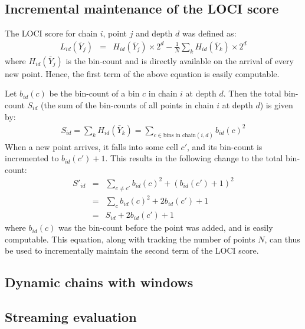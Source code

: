 \documentclass[11pt,onecolumn]{article}
\begin{document}
\pagebreak

\subsection{Incremental maintenance of the LOCI score}

The LOCI score for chain $i$, point $j$ and depth $d$ was defined as:
\begin{eqnarray}
	L_{id}(\bar{Y}_j) &=& H_{id}(\bar{Y}_j)\times 2^d - \frac{1}{N}\sum_{k}H_{id}(\bar{Y}_k)\times 2^d
\end{eqnarray}
where $H_{id}(\bar{Y}_j)$ is the bin-count and is directly available on the arrival of every new point. Hence, the first term of the above equation is easily computable.

Let $b_{id}(c)$ be the bin-count of a bin $c$ in chain $i$ at depth $d$. Then the total bin-count $S_{id}$ (the sum of the bin-counts of all points in chain $i$ at depth $d$) is given by:
\begin{eqnarray}
	S_{id} = \sum_{k}H_{id}(\bar{Y}_k) = \sum_{c \in \textrm{bins in chain}(i,d)} b_{id}(c)^2
\end{eqnarray}
When a new point arrives, it falls into some cell $c'$, and its bin-count is incremented to $b_{id}(c') + 1$. This results in the following change to the total bin-count:
\begin{eqnarray}
	S'_{id} &=& \sum_{c \neq c'} b_{id}(c)^2 + (b_{id}(c') + 1)^2\\
					&=& \sum_{c} b_{id}(c)^2 + 2b_{id}(c') + 1\\
					&=& S_{id} + 2b_{id}(c') + 1
\end{eqnarray}
where $b_{id}(c)$ was the bin-count before the point was added, and is easily computable. This equation, along with tracking the number of points $N$, can thus be used to incrementally maintain the second term of the LOCI score.

\subsection{Dynamic chains with windows}

\pagebreak

\subsection{Streaming evaluation}
\end{document}
